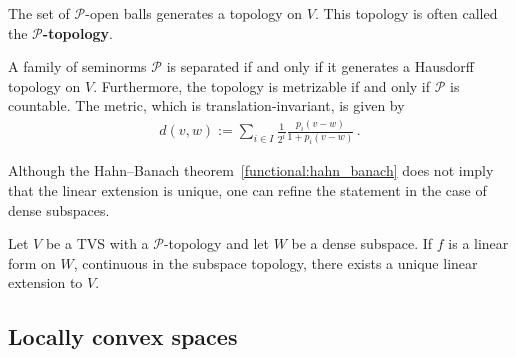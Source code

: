     \begin{property}
        The set of $\mathscr{P}$-open balls generates a topology on $V$. This topology is often called the \textbf{$\mathscr{P}$-topology}.
    \end{property}

    \begin{property}\label{functional:separated_metric}
        A family of seminorms $\mathcal{P}$ is separated if and only if it generates a Hausdorff topology on $V$. Furthermore, the topology is metrizable if and only if $\mathcal{P}$ is countable. The metric, which is translation-invariant, is given by
        \begin{gather}
            d(v,w) := \sum_{i\in I}\frac{1}{2^i}\frac{p_i(v-w)}{1 + p_i(v-w)}\,.
        \end{gather}
    \end{property}

    Although the Hahn--Banach theorem~\ref{functional:hahn_banach} does not imply that the linear extension is unique, one can refine the statement in the case of dense subspaces.
    \begin{result}
        Let $V$ be a TVS with a $\mathscr{P}$-topology and let $W$ be a dense subspace. If $f$ is a linear form on $W$, continuous in the subspace topology, there exists a unique linear extension to $V$.
    \end{result}

\subsection{Locally convex spaces}

